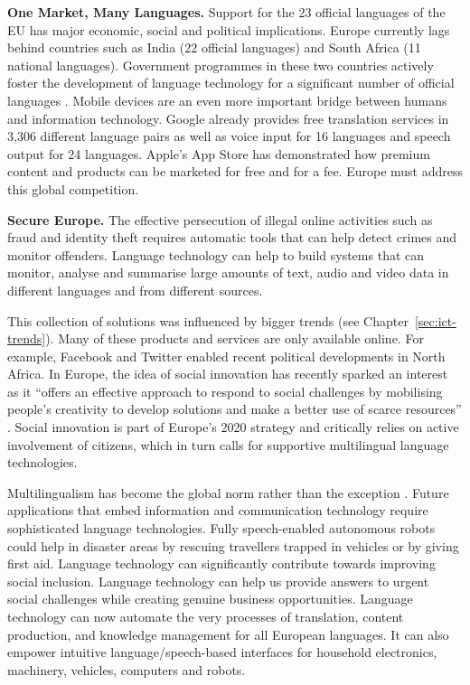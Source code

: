 \documentclass[10pt, plain]{../../metanetpaper}
\begin{document}
\begin{multicols}{2}
\textbf{One Market, Many Languages.} Support for the 23 official languages of the EU has major economic, social and political implications. Europe currently lags behind countries such as India (22 official languages) and South Africa (11 national languages). Government programmes in these two countries actively foster the development of language technology for a significant number of official languages \cite{india2012,sa2012}. Mobile devices are an even more important bridge between humans and information technology. Google already provides free translation services in 3,306 different language pairs as well as voice input for 16 languages and speech output for 24 languages. Apple's App Store has demonstrated how premium content and products can be marketed for free and for a fee. Europe must address this global competition.

\textbf{Secure Europe.} The effective persecution of illegal online activities such as fraud and identity theft requires automatic tools that can help detect crimes and monitor offenders. Language technology can help to build systems that can monitor, analyse and summarise large amounts of text, audio and video data in different languages and from different sources.

This collection of solutions was influenced by bigger trends (see Chapter~\ref{sec:ict-trends}). Many of these products and services are only available online. For example, Facebook and Twitter enabled recent political developments in North Africa. In Europe, the idea of social innovation has recently sparked an interest as it “offers an effective approach to respond to social challenges by mobilising people's creativity to develop solutions and make a better use of scarce resources” \cite{EC5}. Social innovation is part of Europe’s 2020 strategy and critically relies on active involvement of citizens, which in turn calls for supportive multilingual language technologies.

Multilingualism has become the global norm rather than the exception \cite{maaya2012}. Future applications that embed information and communication technology require sophisticated language technologies. Fully speech-enabled autonomous robots could help in disaster areas by rescuing travellers trapped in vehicles or by giving first aid. Language technology can significantly contribute towards improving social inclusion. Language technology can help us provide answers to urgent social challenges while creating genuine business opportunities.  Language technology can now automate the very processes of translation, content production, and knowledge management for all European languages. It can also empower intuitive language/speech-based interfaces for household electronics, machinery, vehicles, computers and robots.


\end{multicols}
\end{document}
